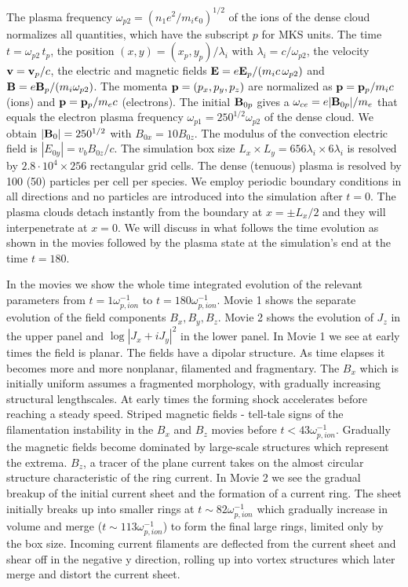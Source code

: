 \documentclass[twocolumn,showpacs,preprintnumbers,amsmath,amssymb]{revtex4}
\begin{document}
The plasma frequency $\omega_{p2}={(n_1 e^2 / m_i \epsilon_0)}^{1/2}$ of the ions of the dense cloud 
normalizes all quantities, which have the subscript $p$ for MKS units. The time $t=\omega_{p2}\, 
t_p$, the position $(x,y)=(x_p,y_p) / \lambda_i$ with $\lambda_i = c / \omega_{p2}$, the velocity 
${\bf v}={\bf v}_p / c$, the electric and magnetic fields ${\bf E} = e {\bf E}_p / (m_i c \, \omega_{p2})$ 
and ${\bf B} = e {\bf B}_p / (m_i \omega_{p2})$. The momenta ${\bf p} = (p_x,p_y,p_z)$ 
are normalized as ${\bf p}= {\bf p}_p / m_i c$ (ions) and ${\bf p}= {\bf p}_p / m_e c$ (electrons). 
The initial ${\bf B}_{0p}$ gives a $\omega_{ce}= e|{\bf B}_{0p}|/m_e$ that equals 
the electron plasma frequency $\omega_{p1} = {250}^{1/2} \omega_{p2}$ of the dense cloud. We obtain 
$|{\bf B}_0|=250^{1/2}$ with $B_{0x}=10B_{0z}$. The modulus of the convection electric field is 
$|E_{0y}| = v_b B_{0z}/c$. The simulation box size $L_x \times L_y = 656 \lambda_i \times 6 \lambda_i$ 
is resolved by $2.8 \cdot 10^4 \times 256$ rectangular grid cells. The dense (tenuous) plasma is resolved 
by 100 (50) particles per cell per species. We employ periodic boundary conditions in all directions and 
no particles are introduced into the simulation after $t=0$. The plasma clouds detach instantly from the 
boundary at $x=\pm L_x/2$ and they will interpenetrate at $x=0$. We will discuss in what follows the time evolution as shown in the movies followed by the 
plasma state at the simulation's end at the time $t=180$.

In the movies we show the whole time integrated evolution of the relevant parameters from $t=1 \omega_{p,ion}^{-1}$ to $t=180 \omega_{p,ion}^{-1}$.
Movie 1 shows the separate evolution of the field components $B_x, B_y, B_z$.
Movie 2 shows the evolution of $J_z$ in the upper panel and $\log |J_x + i J_y|^2$ in the lower panel.
In Movie 1 we see at early times the field is planar.
The fields have a dipolar structure.
As time elapses it becomes more and more nonplanar, filamented and fragmentary.
The $B_x$ which is initially uniform assumes a fragmented morphology, with gradually increasing structural lengthscales.
At early times the forming shock accelerates before reaching a steady speed.
Striped magnetic fields - tell-tale signs of the filamentation instability in the $B_x$ and $B_z$ movies before $t < 43 \omega_{p,ion}^{-1}$.
Gradually the magnetic fields become dominated by large-scale structures which represent the extrema.
$B_z$, a tracer of the plane current takes on the almost circular structure characteristic of the ring current.
In Movie 2 we see the gradual breakup of the initial current sheet and the formation of a current ring.
The sheet initially breaks up into smaller rings at $t \sim 82  \omega_{p,ion}^{-1}$ which gradually increase in volume and merge ($t \sim 113  \omega_{p,ion}^{-1}$) to form the final large rings, limited only by the box size.
Incoming current filaments are deflected from the current sheet and shear off in the negative y direction, rolling up into vortex structures which later merge and distort the current sheet.
\end{document}
